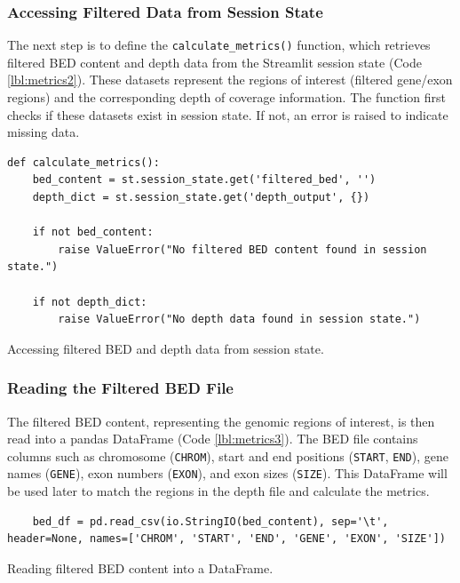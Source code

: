 \subsubsection{\textbf{Accessing Filtered Data from Session State}}

The next step is to define the \texttt{calculate\_metrics()} function, which retrieves filtered BED content and depth data from the Streamlit session state (Code \ref{lbl:metrics2}). These datasets represent the regions of interest (filtered gene/exon regions) and the corresponding depth of coverage information. The function first checks if these datasets exist in session state. If not, an error is raised to indicate missing data.

\begin{longlisting}
\begin{verbatim}
def calculate_metrics():
    bed_content = st.session_state.get('filtered_bed', '')
    depth_dict = st.session_state.get('depth_output', {})

    if not bed_content:
        raise ValueError("No filtered BED content found in session state.")

    if not depth_dict:
        raise ValueError("No depth data found in session state.")
\end{verbatim}
\caption{Accessing filtered BED and depth data from session state.}
\label{lbl:metrics2}
\end{longlisting}

\subsubsection{\textbf{Reading the Filtered BED File}}

The filtered BED content, representing the genomic regions of interest, is then read into a pandas DataFrame (Code \ref{lbl:metrics3}). The BED file contains columns such as chromosome (\texttt{CHROM}), start and end positions (\texttt{START}, \texttt{END}), gene names (\texttt{GENE}), exon numbers (\texttt{EXON}), and exon sizes (\texttt{SIZE}). This DataFrame will be used later to match the regions in the depth file and calculate the metrics.

\begin{longlisting}
\begin{verbatim}
    bed_df = pd.read_csv(io.StringIO(bed_content), sep='\t', header=None, names=['CHROM', 'START', 'END', 'GENE', 'EXON', 'SIZE'])
\end{verbatim}
\caption{Reading filtered BED content into a DataFrame.}
\label{lbl:metrics3}
\end{longlisting}

